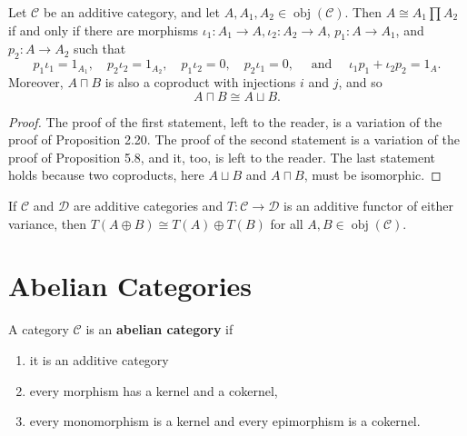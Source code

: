 \documentclass[12pt, oneside]{book}
\begin{document}
\begin{proposition}
    Let $\mathcal{C}$ be an additive category, and let $A, A_1, A_2 \in \operatorname{obj}(\mathcal{C})$. Then $A \cong A_1 \prod A_2$ if and only if there are morphisms $\iota_1: A_1 \rightarrow A, \iota_2: A_2 \rightarrow A$, $p_1: A \rightarrow A_1$, and $p_2: A \rightarrow A_2$ such that
    \begin{equation*}
        p_1 \iota_1=1_{A_1}, \quad p_2 \iota_2=1_{A_2}, \quad p_1 \iota_2=0, \quad p_2 \iota_1=0, \quad \text { and } \quad \iota_1 p_1+\iota_2 p_2=1_A .
    \end{equation*}
    Moreover, $A \sqcap B$ is also a coproduct with injections $i$ and $j$, and so
    \begin{equation*}
        A \sqcap B \cong A \sqcup B .
    \end{equation*}
    \begin{proof}
        The proof of the first statement, left to the reader, is a variation of the proof of Proposition 2.20. The proof of the second statement is a variation of the proof of Proposition 5.8, and it, too, is left to the reader. The last statement holds because two coproducts, here $A \sqcup B$ and $A \sqcap B$, must be isomorphic.
    \end{proof}
\end{proposition}

\begin{corollary}
    If $\mathcal{C}$ and $\mathcal{D}$ are additive categories and $T: \mathcal{C} \rightarrow \mathcal{D}$ is an additive functor of either variance, then $T(A \oplus B) \cong T(A) \oplus T(B)$ for all $A, B \in \operatorname{obj}(\mathcal{C})$.
\end{corollary}




\section{Abelian Categories}
\begin{definition}
    A category $\mathcal{C}$ is an \textbf{abelian category} if
    \begin{enumerate}[label=(\roman*)]
        \item
              it is an additive category
        \item
              every morphism has a kernel and a cokernel,
        \item
              every monomorphism is a kernel and every epimorphism is a cokernel.
    \end{enumerate}
\end{definition}
\end{document}
